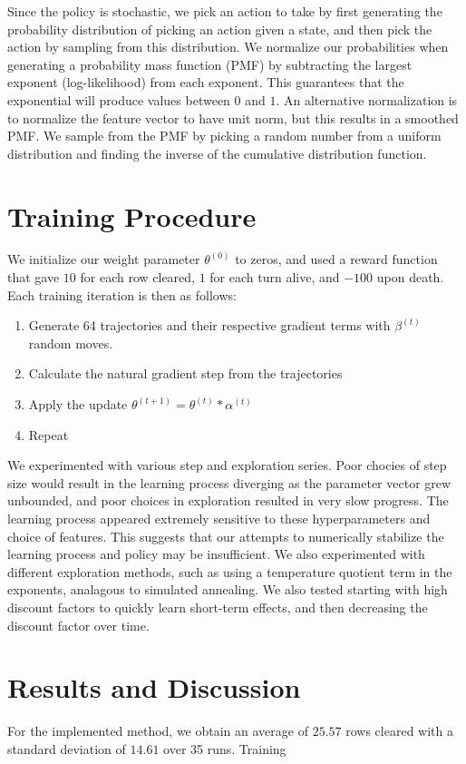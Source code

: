 \documentclass[11pt]{article}
\begin{document}
Since the policy is stochastic, we pick an action to take by first generating the probability distribution of picking an action given a state, and then pick the action by sampling from this distribution. We normalize our probabilities when generating a probability mass function (PMF) by subtracting the largest exponent (log-likelihood) from each exponent. This guarantees that the exponential will produce values between $0$ and $1$. An alternative normalization is to normalize the feature vector to have unit norm, but this results in a smoothed PMF. We sample from the PMF by picking a random number from a uniform distribution and finding the inverse of the cumulative distribution function.

\section{Training Procedure}
We initialize our weight parameter $\theta^{(0)}$ to zeros, and used a reward function that gave $10$ for each row cleared, $1$ for each turn alive, and $-100$ upon death. Each training iteration is then as follows:

\begin{enumerate}
	\item Generate 64 trajectories and their respective gradient terms with $\beta^{(t)}$ random moves.
	\item Calculate the natural gradient step from the trajectories
	\item Apply the update $\theta^{(t+1)} = \theta^{(t)} * \alpha^{(t)}$
	\item Repeat
\end{enumerate}

We experimented with various step and exploration series. Poor chocies of step size would result in the learning process diverging as the parameter vector grew unbounded, and poor choices in exploration resulted in very slow progress. The learning process appeared extremely sensitive to these hyperparameters and choice of features. This suggests that our attempts to numerically stabilize the learning process and policy may be insufficient. We also experimented with different exploration methods, such as using a temperature quotient term in the exponents, analagous to simulated annealing. We also tested starting with high discount factors to quickly learn short-term effects, and then decreasing the discount factor over time.

\section{Results and Discussion}
For the implemented method, we obtain an average of $25.57$ rows cleared with a standard deviation of $14.61$ over 35 runs. Training 



\end{document}
